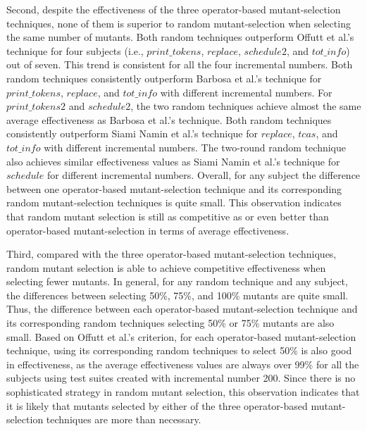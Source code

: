 Second, despite the effectiveness of the three operator-based
mutant-selection techniques, none of them is superior to random
mutant-selection when selecting the same number of mutants. Both
random techniques outperform Offutt et al.'s technique for four
subjects (i.e., $print\_tokens$, $replace$, $schedule2$, and
$tot\_info$) out of seven. This trend is consistent for all the
four incremental numbers. Both random techniques consistently
outperform Barbosa et al.'s technique for $print\_tokens$,
$replace$, and $tot\_info$ with different incremental numbers. For
$print\_tokens2$ and $schedule2$, the two random techniques
achieve almost the same average effectiveness as Barbosa et al.'s
technique. Both random techniques consistently outperform Siami
Namin et al.'s technique for $replace$, $tcas$, and $tot\_info$
with different incremental numbers. The two-round random technique
also achieves similar effectiveness values as Siami Namin et al.'s
technique for $schedule$ for different incremental numbers.
Overall, for any subject the difference between one operator-based
mutant-selection technique and its corresponding random
mutant-selection techniques is quite small. This observation
indicates that random mutant selection is still as competitive as
or even better than operator-based mutant-selection in terms of
average effectiveness.

Third, compared with the three operator-based mutant-selection
techniques, random mutant selection is able to achieve competitive
effectiveness when selecting fewer mutants. In general, for any
random technique and any subject, the differences between
selecting 50\%, 75\%, and 100\% mutants are quite small. Thus, the
difference between each operator-based mutant-selection technique
and its corresponding random techniques selecting 50\% or 75\%
mutants are also small. Based on Offutt et al.'s criterion, for
each operator-based mutant-selection technique, using its
corresponding random techniques to select 50\% is also good in
effectiveness, as the average effectiveness values are always over
99\% for all the subjects using test suites created with
incremental number 200. Since there is no sophisticated strategy
in random mutant selection, this observation indicates that it is
likely that mutants selected by either of the three operator-based
mutant-selection techniques are more than necessary.


